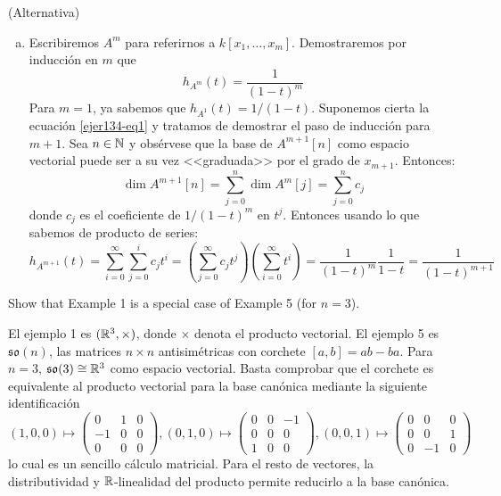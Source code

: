 \documentclass[twoside]{article}
\begin{document}
\begin{solucion}(Alternativa)
\begin{enumerate}[(a)]
\item
Escribiremos $A^m$ para referirnos a $k[x_1,\dots,x_m]$.
Demostraremos por inducción en $m$ que
\begin{equation}\label{ejer134-eq1} h_{A^m}(t) = \frac{1}{(1-t)^m} \end{equation}
Para $m=1$, ya sabemos que $h_{A^1}(t) = 1/(1-t)$.
Suponemos cierta la ecuación \eqref{ejer134-eq1} y tratamos de demostrar el paso de inducción para $m+1$.
Sea $n \in \mathbb{N}$ y obsérvese que la base de $A^{m+1}[n]$ como espacio vectorial puede ser a su vez <<graduada>> por el grado de $x_{m+1}$. Entonces:
\[ \dim A^{m+1}[n] = \sum_{j=0}^{n} \dim A^m[j] = \sum_{j=0}^n c_j\]
donde $c_j$ es el coeficiente de $1/(1-t)^m$ en $t^j$.
Entonces usando lo que sabemos de producto de series:
\[ h_{A^{m+1}}(t) = \sum_{i=0}^{\infty}\sum_{j=0}^i c_jt^i = \left(\sum_{j=0}^{\infty}c_jt^j\right)\left(\sum_{i=0}^{\infty}t^i\right) = \frac{1}{(1-t)^m} \frac{1}{1-t} = \frac{1}{(1-t)^{m+1}}\]
\end{enumerate}
\end{solucion}
\newpage

\begin{ejercicio}{}
Show that Example 1 is a special case of Example 5 (for $n = 3$).
\end{ejercicio}
\begin{solucion}
El ejemplo 	1 es $(\mathbb{R}^3,\times)$, donde $\times$ denota el producto vectorial. El ejemplo 5 es $\mathfrak{so}(n)$, las matrices $n\times n$ antisimétricas con corchete $[a,b]=ab-ba$. Para $n=3$, $\mathfrak{so}(3)\cong \mathbb{R}^3$ como espacio vectorial. Basta comprobar que el corchete es equivalente al producto vectorial para la base canónica mediante la siguiente identificación
\[(1,0,0)\mapsto 
\begin{pmatrix}
0 & 1 & 0\\
-1& 0 & 0\\
0 & 0 & 0
\end{pmatrix}, (0,1,0)\mapsto \begin{pmatrix}
0 & 0 & -1\\
0 & 0 & 0\\
1 & 0 & 0
\end{pmatrix}, (0,0,1)\mapsto\begin{pmatrix}
0 & 0 & 0\\
0 & 0 & 1\\
0 & -1& 0
\end{pmatrix}
\]
lo cual es un sencillo cálculo matricial. Para el resto de vectores, la distributividad y $\mathbb{R}$-linealidad del producto permite reducirlo a la base canónica.
\end{solucion}
\newpage
\end{document}
